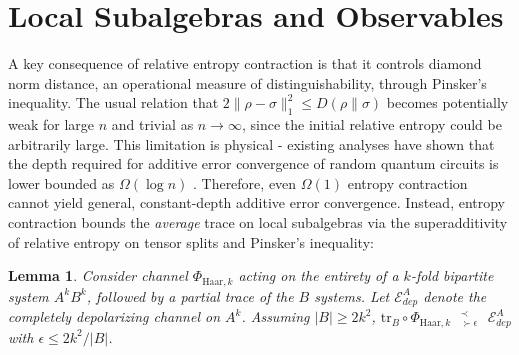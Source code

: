 \documentclass[11pt,reqno]{amsart}
\newtheorem{lemma}{Lemma}[section]
\newcommand{\E}{\mathcal{E}}
\newcommand{\tr}{\text{tr}}
\newcommand{\precsucc}[2]{\text{ } {}^{\prec {#2}}_{\succ {#1}} \text{ } }
\begin{document}
\section{Local Subalgebras and Observables}
A key consequence of relative entropy contraction is that it controls diamond norm distance, an operational measure of distinguishability, through Pinsker's inequality. The usual relation that $2 \| \rho - \sigma \|_1^2 \leq D(\rho \| \sigma)$ becomes potentially weak for large $n$ and trivial as $n \rightarrow \infty$, since the initial relative entropy could be arbitrarily large. This limitation is physical - existing analyses have shown that the depth required for additive error convergence of random quantum circuits is lower bounded as $\Omega(\log n)$ \cite{dalzell_random_2022, deshpande_tight_2022}. Therefore, even $\Omega(1)$ entropy contraction cannot yield general, constant-depth additive error convergence. Instead, entropy contraction bounds the \textit{average} trace on local subalgebras via the superadditivity of relative entropy on tensor splits and Pinsker's inequality:
\begin{lemma} \label{lem:throwaway}
    Consider channel $\Phi_{\mathrm{Haar}, k}$ acting on the entirety of a $k$-fold bipartite system $A^k B^k$, followed by a partial trace of the $B$ systems. Let $\E_{dep}^A$ denote the completely depolarizing channel on $A^k$. Assuming $|B| \geq 2 k^2$, $\tr_B \circ \Phi_{\mathrm{Haar}, k} \precsucc{\epsilon}{} \E_{dep}^A$ with $\epsilon \leq 2 k^2 / |B|$.
\end{lemma}
\end{document}
